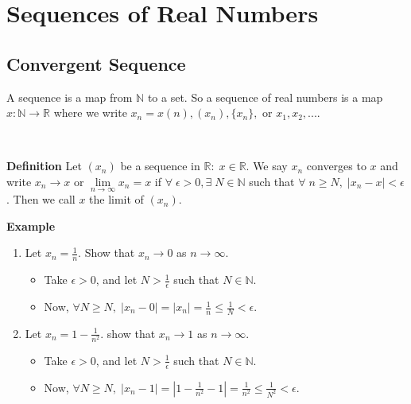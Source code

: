 \documentclass[12pt]{article}
\begin{document}
\section{Sequences of Real Numbers}
\subsection{Convergent Sequence}
\begin{block}A sequence is a map from $\mathbb{N}$ to a set. So a sequence of real numbers is a map $x\colon \mathbb{N}\to\mathbb{R}$ where we write $x_n=x(n), (x_n), \{x_n\}, \text{ or } x_1,x_2,...$.\end{block} \\

\begin{block}{\bf Definition} Let $(x_n)$ be a sequence in $\mathbb{R}\colon\; x\in\mathbb{R}$. We say $x_n$ converges to $x$ and write $x_n\to x$ or $\lim\limits_{n\to\infty} x_n = x$ if $\forall\;\epsilon>0, \exists\;N\in\mathbb{N}$ such that $\forall\;n\ge N,\; |x_n-x|<\epsilon$. Then we call $x$ the limit of $(x_n)$.\end{block}

\vspace{1.5\baselineskip}
\begin{block}{\bf Example} 
\begin{enumerate}[label=(\roman*)]
    \item Let $x_n=\frac{1}{n}.$ Show that $x_n\to 0$ as $n\to\infty$.
    \begin{itemize}
        \item Take $\epsilon>0$, and let $N>\frac{1}{\epsilon}$ such that $N\in \mathbb{N}.$
        \item Now, $\forall N\ge N,\; |x_n-0|=|x_n| = \frac{1}{n}\le \frac{1}{N}<\epsilon$.
    \end{itemize}
    
    \item Let $x_n = 1-\frac{1}{n^2}$. show that $x_n\to 1$ as $n\to \infty$.
    \begin{itemize}
        \item Take $\epsilon>0$, and let $N>\frac{1}{\epsilon}$ such that $N\in \mathbb{N}.$
        \item Now, $\forall N\ge N,\; |x_n- 1|=|1-\frac{1}{n^2} -1| = \frac{1}{n^2} \le \frac{1}{N^2} < \epsilon$.
    \end{itemize}
\end{enumerate}
\end{block}
\end{document}
